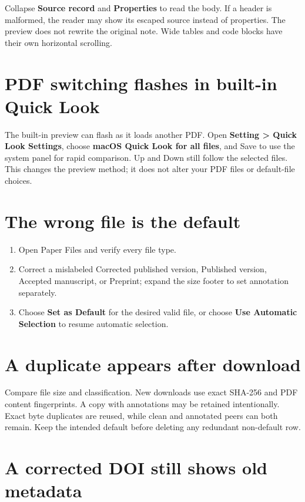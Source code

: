 \documentclass[10pt,letterpaper,oneside]{scrreprt}
\providecommand{\tightlist}{\setlength{\itemsep}{1pt}\setlength{\parskip}{0pt}}
\begin{document}
Collapse \textbf{Source record} and \textbf{Properties} to read the body. If a header is malformed, the reader may show its escaped source instead of properties. The preview does not rewrite the original note. Wide tables and code blocks have their own horizontal scrolling.

\section{PDF switching flashes in built-in Quick Look}\label{pdf-switching-flashes-in-built-in-quick-look}

The built-in preview can flash as it loads another PDF. Open \textbf{Setting \textgreater{} Quick Look Settings}, choose \textbf{macOS Quick Look for all files}, and Save to use the system panel for rapid comparison. Up and Down still follow the selected files. This changes the preview method; it does not alter your PDF files or default-file choices.

\section{The wrong file is the default}\label{the-wrong-file-is-the-default}

\begin{enumerate}
\tightlist
\item
  Open Paper Files and verify every file type.
\item
  Correct a mislabeled Corrected published version, Published version, Accepted manuscript, or Preprint; expand the size footer to set annotation separately.
\item
  Choose \textbf{Set as Default} for the desired valid file, or choose \textbf{Use Automatic Selection} to resume automatic selection.
\end{enumerate}

\section{A duplicate appears after download}\label{a-duplicate-appears-after-download}

Compare file size and classification. New downloads use exact SHA-256 and PDF content fingerprints. A copy with annotations may be retained intentionally. Exact byte duplicates are reused, while clean and annotated peers can both remain. Keep the intended default before deleting any redundant non-default row.

\section{A corrected DOI still shows old metadata}\label{a-corrected-doi-still-shows-old-metadata}
\end{document}
